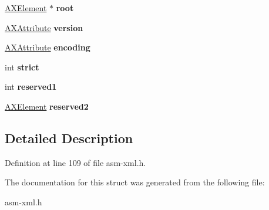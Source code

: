 \begin{DoxyCompactItemize}
\item 
\hypertarget{structAXParseContext_abbfb8fa74b23b2ffa1ae525d152f7de8}{\hyperlink{structAXElement}{A\-X\-Element} $\ast$ {\bfseries root}}\label{structAXParseContext_abbfb8fa74b23b2ffa1ae525d152f7de8}

\item 
\hypertarget{structAXParseContext_ad72efee79dabe93fd5c727d8ac45debe}{\hyperlink{structAXAttribute}{A\-X\-Attribute} {\bfseries version}}\label{structAXParseContext_ad72efee79dabe93fd5c727d8ac45debe}

\item 
\hypertarget{structAXParseContext_aa648e6265415ac07a27979915cf819e4}{\hyperlink{structAXAttribute}{A\-X\-Attribute} {\bfseries encoding}}\label{structAXParseContext_aa648e6265415ac07a27979915cf819e4}

\item 
\hypertarget{structAXParseContext_a4a9e03e88d265596933243382bfd1e6c}{int {\bfseries strict}}\label{structAXParseContext_a4a9e03e88d265596933243382bfd1e6c}

\item 
\hypertarget{structAXParseContext_a6cd25c5debf301e2ddd95ea65b005a28}{int {\bfseries reserved1}}\label{structAXParseContext_a6cd25c5debf301e2ddd95ea65b005a28}

\item 
\hypertarget{structAXParseContext_a8485db960f6b00ce1c6a3b58b3cd9e9c}{\hyperlink{structAXElement}{A\-X\-Element} {\bfseries reserved2}}\label{structAXParseContext_a8485db960f6b00ce1c6a3b58b3cd9e9c}

\end{DoxyCompactItemize}


\subsection{Detailed Description}


Definition at line 109 of file asm-\/xml.\-h.



The documentation for this struct was generated from the following file\-:\begin{DoxyCompactItemize}
\item 
asm-\/xml.\-h\end{DoxyCompactItemize}
